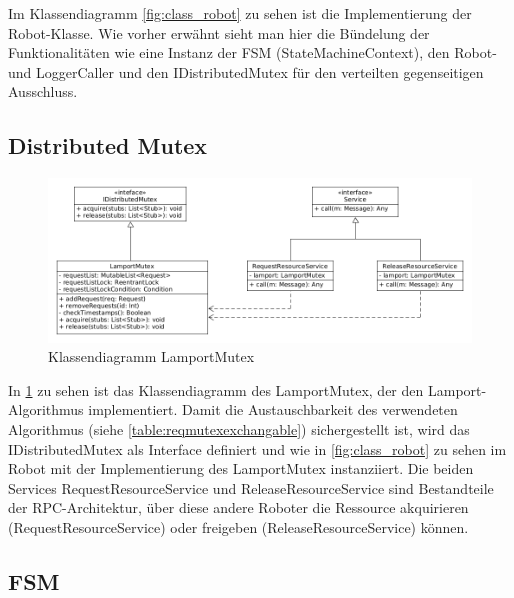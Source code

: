 Im Klassendiagramm \ref{fig:class_robot} zu sehen ist die Implementierung der Robot-Klasse.
Wie vorher erwähnt sieht man hier die Bündelung der Funktionalitäten wie eine 
Instanz der FSM (StateMachineContext), den Robot- und LoggerCaller und den IDistributedMutex für
den verteilten gegenseitigen Ausschluss.

\clearpage

\subsection{Distributed Mutex}

\begin{figure}[h]
 \includegraphics[width=\textwidth]{../diagrams/4_lamport_klassendiagramm.png}
 \caption{Klassendiagramm LamportMutex}
 \label{fig:class_lamport}
\end{figure}

In \ref{fig:class_lamport} zu sehen ist das Klassendiagramm des LamportMutex, der den Lamport-Algorithmus
implementiert. Damit die Austauschbarkeit des verwendeten Algorithmus (siehe \ref{table:reqmutexexchangable})
sichergestellt ist, wird das IDistributedMutex als Interface definiert und wie in \ref{fig:class_robot}
zu sehen im Robot mit der Implementierung des LamportMutex instanziiert. Die beiden Services RequestResourceService
und ReleaseResourceService sind Bestandteile der RPC-Architektur, über diese andere Roboter die Ressource
akquirieren (RequestResourceService) oder freigeben (ReleaseResourceService) können.

\clearpage

\subsection{FSM}

